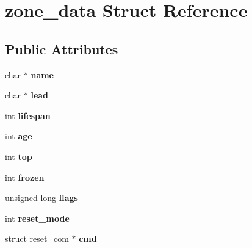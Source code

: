 \hypertarget{structzone__data}{\section{zone\-\_\-data Struct Reference}
\label{structzone__data}
}
\subsection*{Public Attributes}
\begin{DoxyCompactItemize}
\item 
\hypertarget{structzone__data_aa44d6c4fc1b3364774fb67e528921049}{char $\ast$ {\bfseries name}}\label{structzone__data_aa44d6c4fc1b3364774fb67e528921049}

\item 
\hypertarget{structzone__data_af064c07ef1bcc6651ff1e7277d43a094}{char $\ast$ {\bfseries lead}}\label{structzone__data_af064c07ef1bcc6651ff1e7277d43a094}

\item 
\hypertarget{structzone__data_a394287a0eed95620a43f136591f9e625}{int {\bfseries lifespan}}\label{structzone__data_a394287a0eed95620a43f136591f9e625}

\item 
\hypertarget{structzone__data_a2bf69f347f8b44b42e9764adfae64c05}{int {\bfseries age}}\label{structzone__data_a2bf69f347f8b44b42e9764adfae64c05}

\item 
\hypertarget{structzone__data_a52c145458a8411e424e7c92f963f794b}{int {\bfseries top}}\label{structzone__data_a52c145458a8411e424e7c92f963f794b}

\item 
\hypertarget{structzone__data_afa13f578b59e814f39aa7409739f63c4}{int {\bfseries frozen}}\label{structzone__data_afa13f578b59e814f39aa7409739f63c4}

\item 
\hypertarget{structzone__data_a721d4d33a3acb9069abf285f63675a76}{unsigned long {\bfseries flags}}\label{structzone__data_a721d4d33a3acb9069abf285f63675a76}

\item 
\hypertarget{structzone__data_a7daf7b5ca0284906e38b1c34ee1fb00b}{int {\bfseries reset\-\_\-mode}}\label{structzone__data_a7daf7b5ca0284906e38b1c34ee1fb00b}

\item 
\hypertarget{structzone__data_af2c89353f1a217211fd7b77902a268e8}{struct \hyperlink{structreset__com}{reset\-\_\-com} $\ast$ {\bfseries cmd}}\label{structzone__data_af2c89353f1a217211fd7b77902a268e8}


\end{DoxyCompactItemize}
